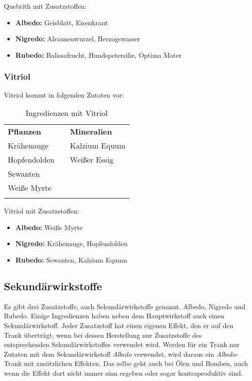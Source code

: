 Quebrith mit Zusatzstoffen:
\begin{itemize}
\item \textbf{Albedo:} Geisblatt, Eisenkraut
\item \textbf{Nigredo:} Alraunenwurzel, Herzogswasser
\item \textbf{Rubedo:} Balissafrucht, Hundspetersilie, Optima Mater
\end{itemize}


\subsubsection{Vitriol}
Vitriol kommt in folgenden Zutaten vor:
\begin{longtable}{p{5cm}p{2cm}p{5cm}}
\textbf{Pflanzen} & & \textbf{Mineralien} \\ \cline{1-1} \cline{3-3}
Krähenauge & & Kalzium Equum \\
Hopfendolden & & Weißer Essig \\
Sewanten & & \\
Weiße Myrte & & \\

\caption{Ingredienzen mit Vitriol}
\label{tab:ingredienzen_mit_vitriol}
\end{longtable}

Vitriol mit Zusatzstoffen:
\begin{itemize}
\item \textbf{Albedo:} Weiße Myrte
\item \textbf{Nigredo:} Krähenauge, Hopfendolden
\item \textbf{Rubedo:} Sewanten, Kalzium Equum
\end{itemize}


\subsection{Sekundärwirkstoffe}
\label{chap:sekundaerwirkstoffe}
Es gibt drei Zusatzstoffe, auch Sekundärwirkstoffe genannt. Albedo, Nigredo und Rubedo. Einige Ingredienzen haben neben dem Hauptwirkstoff auch einen Sekundärwirkstoff. Jeder Zusatzstoff hat einen eigenen Effekt, den er auf den Trank überträgt, wenn bei dessen Herstellung nur Zusatzstoffe des entsprechenden Sekundärwirkstoffes verwendet wird. Werden für ein Trank nur Zutaten mit dem Sekundärwirkstoff \textit{Albedo} verwendet, wird daraus ein \textit{Albedo}-Trank mit zusätzlichen Effekten. Das selbe geht auch bei Ölen und Bomben, auch wenn die Effekt dort nicht immer sinn ergeben oder sogar kontraproduktiv sind.


